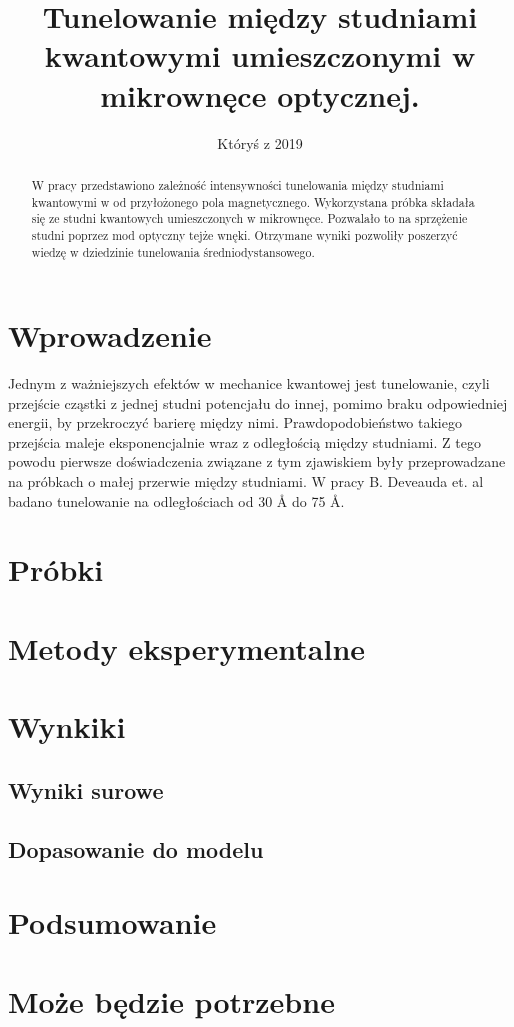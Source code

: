 \documentclass[licencjacka]{pracamgr}
\title{Tunelowanie między studniami kwantowymi umieszczonymi w mikrownęce optycznej.}
\date{Któryś z 2019}
\begin{document}
\maketitle

\begin{abstract}
  W pracy przedstawiono zależność intensywności tunelowania między studniami kwantowymi w od przyłożonego pola magnetycznego. Wykorzystana próbka składała się ze studni kwantowych umieszczonych w mikrownęce. Pozwalało to na sprzężenie studni poprzez mod optyczny tejże wnęki. Otrzymane wyniki pozwoliły poszerzyć wiedzę w dziedzinie tunelowania średniodystansowego.
\end{abstract}

\tableofcontents

\chapter*{Wprowadzenie}
Jednym z ważniejszych efektów w mechanice kwantowej jest tunelowanie, czyli przejście cząstki z jednej studni potencjału do innej, pomimo braku odpowiedniej energii, by przekroczyć barierę między nimi. Prawdopodobieństwo takiego przejścia maleje eksponencjalnie wraz z odległością między studniami. Z tego powodu pierwsze doświadczenia związane z tym zjawiskiem były przeprowadzane na próbkach o małej przerwie między studniami. W pracy B. Deveauda et. al \cite{1990} badano tunelowanie na odległościach od 30 \r{A} do 75 \r{A}.


\chapter{Próbki}\label{r:probki}



\chapter{Metody eksperymentalne}\label{r:metody}



\chapter{Wynkiki}\label{r:wyniki}
\section{Wyniki surowe}
\section{Dopasowanie do modelu}




\chapter{Podsumowanie}


\appendix

\chapter{Może będzie potrzebne}



\end{document}

